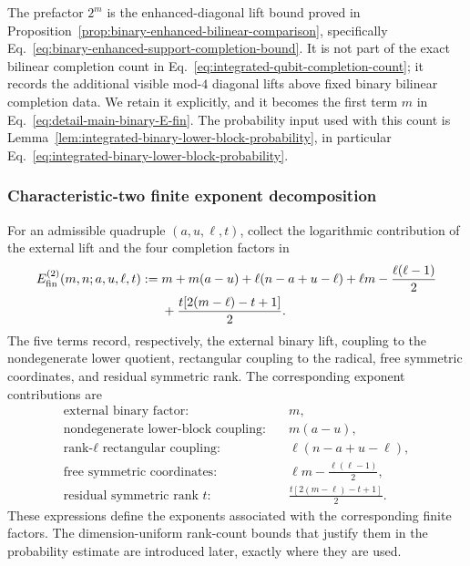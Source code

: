 \documentclass[11pt]{article}
\newcommand{\1}{\mathbf 1}
\theoremstyle{plain}
\theoremstyle{definition}
\theoremstyle{remark}
\begin{document}
The prefactor $2^m$ is the enhanced-diagonal lift bound proved in
Proposition~\ref{prop:binary-enhanced-bilinear-comparison}, specifically
Eq.~\eqref{eq:binary-enhanced-support-completion-bound}.  It is not part of the
exact bilinear completion count in
Eq.~\eqref{eq:integrated-qubit-completion-count}; it records the additional
visible mod-$4$ diagonal lifts above fixed binary bilinear completion data.  We retain it
explicitly, and it becomes the first term $m$ in
Eq.~\eqref{eq:detail-main-binary-E-fin}.  The probability input used with this count
is Lemma~\ref{lem:integrated-binary-lower-block-probability}, in particular
Eq.~\eqref{eq:integrated-binary-lower-block-probability}.


\subsubsection{Characteristic-two finite exponent decomposition}\label{subsubsec:binary-finite-exponent-decomposition}
For an admissible quadruple $(a,u,\ell,t)$, collect the logarithmic
contribution of the external lift and the four completion factors in
\begin{align}
 E_{\rm fin}^{(2)}(m,n;a,u,\ell,t)
 :={}&m+m(a-u)+\ell(n-a+u-\ell)
 +\ell m-\frac{\ell(\ell-1)}2\notag\\
 &+\frac{t[2(m-\ell)-t+1]}2.
 \label{eq:detail-main-binary-E-fin}
\end{align}
The five terms record, respectively, the external binary lift, coupling to the
nondegenerate lower quotient, rectangular coupling to the radical, free
symmetric coordinates, and residual symmetric rank.  The corresponding exponent contributions are
\begin{align}
 \text{external binary factor:}\quad &m,
 \label{eq:main-binary-exponent-external}\\
 \text{nondegenerate lower-block coupling:}\quad &m(a-u),
 \label{eq:main-binary-exponent-unreported-coupling}\\
 \text{rank-$\ell$ rectangular coupling:}\quad
 &\ell(n-a+u-\ell),
 \label{eq:main-binary-exponent-rectangular}\\
 \text{free symmetric coordinates:}\quad
 &\ell m-\frac{\ell(\ell-1)}2,
 \label{eq:main-binary-exponent-free-symmetric}\\
 \text{residual symmetric rank $t$:}\quad
 &\frac{t[2(m-\ell)-t+1]}2.
 \label{eq:main-binary-exponent-residual}
\end{align}
These expressions define the exponents associated with the corresponding finite factors.  The dimension-uniform rank-count bounds that justify them in
the probability estimate are introduced later, exactly where they are used.
\end{document}
